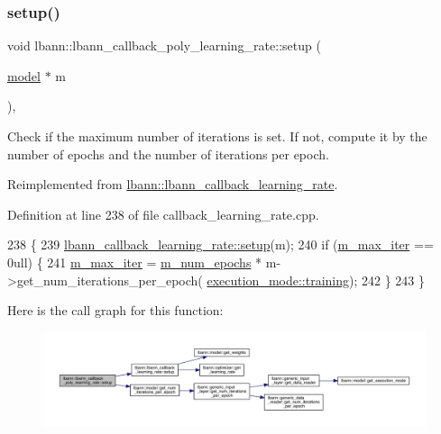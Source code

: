 \subsubsection{\texorpdfstring{setup()}{setup()}}
{\footnotesize\ttfamily void lbann\+::lbann\+\_\+callback\+\_\+poly\+\_\+learning\+\_\+rate\+::setup (\begin{DoxyParamCaption}\item[{\hyperlink{classlbann_1_1model}{model} $\ast$}]{m }\end{DoxyParamCaption})\hspace{0.3cm}{\ttfamily [override]}, {\ttfamily [virtual]}}

Check if the maximum number of iterations is set. If not, compute it by the number of epochs and the number of iterations per epoch. 

Reimplemented from \hyperlink{classlbann_1_1lbann__callback__learning__rate_a501f31a6b8fde1282a60e4b347e8d9d3}{lbann\+::lbann\+\_\+callback\+\_\+learning\+\_\+rate}.



Definition at line 238 of file callback\+\_\+learning\+\_\+rate.\+cpp.


\begin{DoxyCode}
238                                                       \{
239   \hyperlink{classlbann_1_1lbann__callback__learning__rate_a501f31a6b8fde1282a60e4b347e8d9d3}{lbann\_callback\_learning\_rate::setup}(m);
240   \textcolor{keywordflow}{if} (\hyperlink{classlbann_1_1lbann__callback__poly__learning__rate_a43c06187577baff885bda6177fe56c3f}{m\_max\_iter} == 0ull) \{
241     \hyperlink{classlbann_1_1lbann__callback__poly__learning__rate_a43c06187577baff885bda6177fe56c3f}{m\_max\_iter} = \hyperlink{classlbann_1_1lbann__callback__poly__learning__rate_a493de3bbdea4bed802e663af9b81af8e}{m\_num\_epochs} * m->get\_num\_iterations\_per\_epoch(
      \hyperlink{base_8hpp_a2781a159088df64ed7d47cc91c4dc0a8ac185ddac8b5a8f5aa23c5b80bc12d214}{execution\_mode::training});
242   \}
243 \}
\end{DoxyCode}
Here is the call graph for this function\+:\nopagebreak
\begin{figure}[H]
\begin{center}
\leavevmode
\includegraphics[width=350pt]{classlbann_1_1lbann__callback__poly__learning__rate_a47d3d2a94157f1992bf4a964620208f3_cgraph}
\end{center}
\end{figure}


